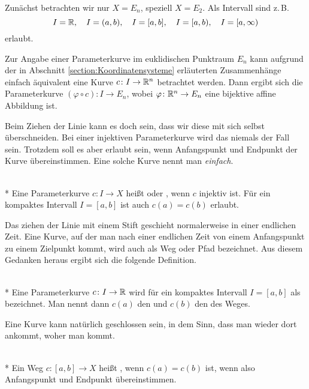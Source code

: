 \noindent
Zunächst betrachten wir nur $X=E_n$, speziell $X=E_2$. Als Intervall
sind z.\,B.%
\[I=\mathbb R,\quad I=(a,b),\quad I=[a,b],\quad
I=[a,b),\quad I=[a,\infty)\]
erlaubt.

Zur Angabe einer Parameterkurve im euklidischen Punktraum $E_n$ kann
aufgrund der in Abschnitt \ref{section:Koordinatensysteme} erläuterten
Zusammenhänge einfach äquivalent eine Kurve $c\colon I \to\mathbb R^n$
betrachtet werden. Dann ergibt sich die Parameterkurve
$(\varphi\circ c)\colon I\to E_n$,
wobei $\varphi\colon \mathbb R^n\to E_n$ eine bijektive affine Abbildung ist.

Beim Ziehen der Linie kann es doch sein, dass wir diese mit sich selbst
überschneiden. Bei einer injektiven Parameterkurve wird das niemals
der Fall sein. Trotzdem soll es aber erlaubt sein, wenn Anfangspunkt
und Endpunkt der Kurve übereinstimmen. Eine solche Kurve nennt man
\emph{einfach}.

\begin{definition}\mbox{}\\*
Eine Parameterkurve $c\colon I\to X$ heißt  oder
, wenn $c$ injektiv ist. Für ein kompaktes
Intervall $I=[a,b]$ ist auch $c(a)=c(b)$ erlaubt.
\end{definition}

\noindent
Das ziehen der Linie mit einem Stift geschieht normalerweise in einer
endlichen Zeit. Eine Kurve, auf der man nach einer endlichen Zeit
von einem Anfangspunkt zu einem Zielpunkt kommt, wird auch als
Weg oder Pfad bezeichnet. Aus diesem Gedanken heraus
ergibt sich die folgende Definition.

\begin{definition}\mbox{}\\*
Eine Parameterkurve $c\colon I\to\mathbb R$ wird für ein kompaktes
Intervall $I=[a,b]$ als  bezeichnet. Man nennt dann
$c(a)$ den  und $c(b)$ den
 des Weges.
\end{definition}

\noindent
Eine Kurve kann natürlich geschlossen sein, in dem Sinn, dass man
wieder dort ankommt, woher man kommt.

\begin{definition}\mbox{}\\*
Ein Weg $c\colon [a,b]\to X$ heißt ,
wenn $c(a)=c(b)$ ist, wenn also Anfangspunkt und
Endpunkt übereinstimmen.
\end{definition}


